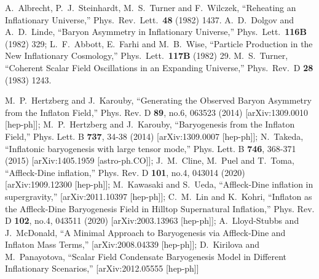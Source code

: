 \documentclass[%
aps,prd,nofootinbib,showkeys,a4paper,10pt
]{revtex4-2}
\begin{document}
\begin{thebibliography}{10}
A.~Albrecht, P.~J.~Steinhardt, M.~S.~Turner and F.~Wilczek,
``Reheating an Inflationary Universe,''
Phys.\ Rev.\ Lett.\  {\bf 48} (1982) 1437.
A.~D.~Dolgov and A.~D.~Linde,
``Baryon Asymmetry in Inflationary Universe,''
Phys.\ Lett.\  {\bf 116B} (1982) 329;
L.~F.~Abbott, E.~Farhi and M.~B.~Wise,
``Particle Production in the New Inflationary Cosmology,''
Phys.\ Lett.\  {\bf 117B} (1982) 29.
M.~S.~Turner,
``Coherent Scalar Field Oscillations in an Expanding Universe,''
Phys.\ Rev.\ D {\bf 28} (1983) 1243.
 


M.~P.~Hertzberg and J.~Karouby,
``Generating the Observed Baryon Asymmetry from the Inflaton Field,''
Phys. Rev. D \textbf{89}, no.6, 063523 (2014)
[arXiv:1309.0010 [hep-ph]];
M.~P.~Hertzberg and J.~Karouby,
``Baryogenesis from the Inflaton Field,''
Phys. Lett. B \textbf{737}, 34-38 (2014)
[arXiv:1309.0007 [hep-ph]];
N.~Takeda,
``Inflatonic baryogenesis with large tensor mode,''
Phys. Lett. B \textbf{746}, 368-371 (2015)
[arXiv:1405.1959 [astro-ph.CO]];
J.~M.~Cline, M.~Puel and T.~Toma,
``Affleck-Dine inflation,''
Phys. Rev. D \textbf{101}, no.4, 043014 (2020)
[arXiv:1909.12300 [hep-ph]];
M.~Kawasaki and S.~Ueda,
``Affleck-Dine inflation in supergravity,''
[arXiv:2011.10397 [hep-ph]];
C.~M.~Lin and K.~Kohri,
``Inflaton as the Affleck-Dine Baryogenesis Field in Hilltop Supernatural Inflation,''
Phys. Rev. D \textbf{102}, no.4, 043511 (2020)
[arXiv:2003.13963 [hep-ph]];
A.~Lloyd-Stubbs and J.~McDonald,
``A Minimal Approach to Baryogenesis via Affleck-Dine and Inflaton Mass Terms,''
[arXiv:2008.04339 [hep-ph]];
D.~Kirilova and M.~Panayotova,
``Scalar Field Condensate Baryogenesis Model in Different Inflationary Scenarios,''
[arXiv:2012.05555 [hep-ph]]



\end{thebibliography}
\end{document}
